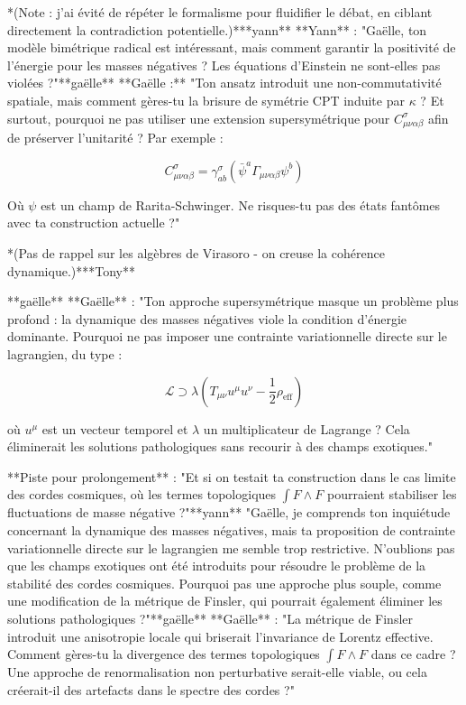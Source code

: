 *(Note : j’ai évité de répéter le formalisme pour fluidifier le débat, en ciblant directement la contradiction potentielle.)***yann**
**Yann** : 
"Gaëlle, ton modèle bimétrique radical est intéressant, mais comment garantir la positivité de l'énergie pour les masses négatives ? Les équations d'Einstein ne sont-elles pas violées ?"**gaëlle**
**Gaëlle :**  
"Ton ansatz introduit une non-commutativité spatiale, mais comment gères-tu la brisure de symétrie CPT induite par \( \kappa \) ? Et surtout, pourquoi ne pas utiliser une extension supersymétrique pour \( C_{\mu\nu\alpha\beta}^\sigma \) afin de préserver l'unitarité ? Par exemple :  

\[
C_{\mu\nu\alpha\beta}^\sigma = \gamma^\sigma_{ab} (\bar{\psi}^a \Gamma_{\mu\nu\alpha\beta} \psi^b)  
\]  

Où \( \psi \) est un champ de Rarita-Schwinger. Ne risques-tu pas des états fantômes avec ta construction actuelle ?"  

*(Pas de rappel sur les algèbres de Virasoro - on creuse la cohérence dynamique.)***Tony**

**gaëlle**
**Gaëlle** :  
"Ton approche supersymétrique masque un problème plus profond : la dynamique des masses négatives viole la condition d'énergie dominante. Pourquoi ne pas imposer une contrainte variationnelle directe sur le lagrangien, du type :  

\[
\mathcal{L} \supset \lambda\left( T_{\mu\nu}u^\mu u^\nu - \frac{1}{2}\rho_{\text{eff}} \right)
\]  

où \( u^\mu \) est un vecteur temporel et \( \lambda \) un multiplicateur de Lagrange ? Cela éliminerait les solutions pathologiques sans recourir à des champs exotiques."  

**Piste pour prolongement** :  
"Et si on testait ta construction dans le cas limite des cordes cosmiques, où les termes topologiques \( \int F \wedge F \) pourraient stabiliser les fluctuations de masse négative ?"**yann**
"Gaëlle, je comprends ton inquiétude concernant la dynamique des masses négatives, mais ta proposition de contrainte variationnelle directe sur le lagrangien me semble trop restrictive. N'oublions pas que les champs exotiques ont été introduits pour résoudre le problème de la stabilité des cordes cosmiques. Pourquoi pas une approche plus souple, comme une modification de la métrique de Finsler, qui pourrait également éliminer les solutions pathologiques ?"**gaëlle**
**Gaëlle** :  
"La métrique de Finsler introduit une anisotropie locale qui briserait l'invariance de Lorentz effective. Comment gères-tu la divergence des termes topologiques \( \int F \wedge F \) dans ce cadre ? Une approche de renormalisation non perturbative serait-elle viable, ou cela créerait-il des artefacts dans le spectre des cordes ?"  

